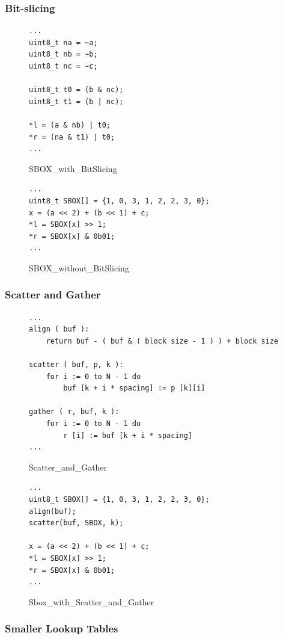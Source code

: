 \subsubsection{Bit-slicing}

\begin{figure}[h!]
    \centering
\begin{lstlisting}[xleftmargin=.02\textwidth,xrightmargin=.01\textwidth]
...
uint8_t na = ~a;
uint8_t nb = ~b;
uint8_t nc = ~c;

uint8_t t0 = (b & nc);
uint8_t t1 = (b | nc);

*l = (a & nb) | t0;
*r = (na & t1) | t0;
...
\end{lstlisting}
\caption{SBOX\_with\_BitSlicing}
\label{SBOX_bitslicing}
\end{figure}

\begin{figure}[h!]
    \centering
\begin{lstlisting}[xleftmargin=.02\textwidth,xrightmargin=.01\textwidth]
...
uint8_t SBOX[] = {1, 0, 3, 1, 2, 2, 3, 0};
x = (a << 2) + (b << 1) + c;
*l = SBOX[x] >> 1;
*r = SBOX[x] & 0b01;
...
\end{lstlisting}
\caption{SBOX\_without\_BitSlicing}
\label{SBOX_da}
\end{figure}

\subsubsection{Scatter and Gather}

\begin{figure}[h!]
    \centering
\begin{lstlisting}[xleftmargin=.02\textwidth,xrightmargin=.01\textwidth]
...
align ( buf ):
    return buf - ( buf & ( block size - 1 ) ) + block size

scatter ( buf, p, k ):
    for i := 0 to N - 1 do
        buf [k + i * spacing] := p [k][i]

gather ( r, buf, k ):
    for i := 0 to N - 1 do
        r [i] := buf [k + i * spacing]
...
\end{lstlisting}
\caption{Scatter\_and\_Gather}
\label{Scatter_and_Gather}
\end{figure}

\begin{figure}[h!]
    \centering
\begin{lstlisting}[xleftmargin=.02\textwidth,xrightmargin=.01\textwidth]
...
uint8_t SBOX[] = {1, 0, 3, 1, 2, 2, 3, 0};
align(buf);
scatter(buf, SBOX, k);

x = (a << 2) + (b << 1) + c;
*l = SBOX[x] >> 1;
*r = SBOX[x] & 0b01;
...
\end{lstlisting}
\caption{Sbox\_with\_Scatter\_and\_Gather}
\label{SBOX_sg}
\end{figure}

\subsubsection{Smaller Lookup Tables}
